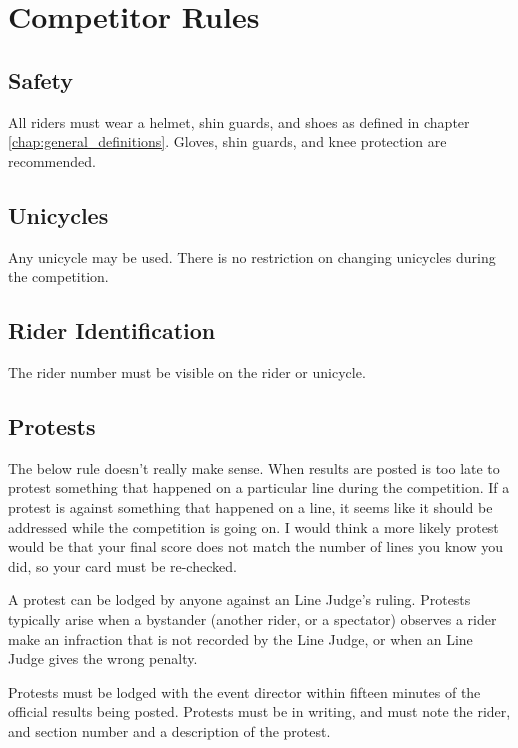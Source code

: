\chapter{Competitor Rules}

\section{Safety}

All riders must wear a helmet, shin guards, and shoes as defined in chapter \ref{chap:general_definitions}.
Gloves, shin guards, and knee protection are recommended.

\section{Unicycles}

Any unicycle may be used.
There is no restriction on changing unicycles during the competition.

\section{Rider Identification}

The rider number must be visible on the rider or unicycle.

\section{Protests}

\begin{comment2016}
The below rule doesn't really make sense.
When results are posted is too late to protest something that happened on a particular line during the competition.
If a protest is against something that happened on a line, it seems like it should be addressed while the competition is going on.
I would think a more likely protest would be that your final score does not match the number of lines you know you did, so your card must be re-checked.
\end{comment2016}

A protest can be lodged by anyone against an Line Judge's ruling.
Protests typically arise when a bystander (another rider, or a spectator) observes a rider make an infraction that is not recorded by the Line Judge, or when an Line Judge gives the wrong penalty.

Protests must be lodged with the event director within fifteen minutes of the official results being posted.
Protests must be in writing, and must note the rider, and section number and a description of the protest.

